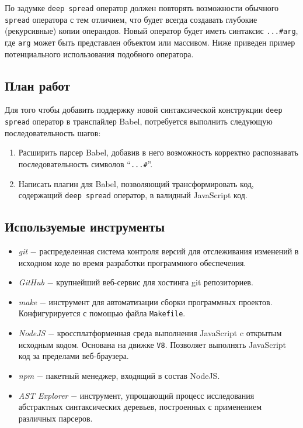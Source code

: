 \documentclass[14pt, a4paper]{article}
\def\code#1{\texttt{#1}} %
\begin{document}
По задумке \code{deep spread} оператор должен повторять возможности обычного \code{spread} оператора с тем отличием,
что будет всегда создавать глубокие (рекурсивные) копии операндов. Новый оператор будет иметь синтаксис \code{...\#arg},
где \code{arg} может быть представлен объектом или массивом. Ниже приведен пример потенциального 
использования подобного оператора.


\subsection{План работ}
Для того чтобы добавить поддержку новой синтаксической конструкции \code{deep spread} оператор в 
транспайлер Babel, потребуется выполнить следующую последовательность шагов:
\begin{enumerate}
  \item Расширить парсер Babel, добавив в него возможность корректно распознавать последовательность символов 
    ``\code{...\#}''. 
  \item Написать плагин для Babel, позволяющий трансформировать код, содержащий \code{deep spread} оператор,
  в валидный JavaScript код.
  
\end{enumerate}

\subsection{Используемые инструменты}
\begin{itemize}
  \item \textit{git} $-$ распределенная система контроля версий для отслеживания изменений в исходном коде 
    во время разработки программного обеспечения.
  \item \textit{GitHub} $-$ крупнейший веб-сервис для хостинга git репозиториев.
  \item \textit{make} $-$ инструмент для автоматизации сборки программных проектов. Конфигурируется с помощью файла 
    \code{Makefile}.
  \item \textit{NodeJS} $-$ кроссплатформенная среда выполнения JavaScript c открытым исходным кодом.
    Основана на движке \code{V8}. Позволяет выполнять JavaScript код за пределами веб-браузера.
  \item \textit{npm} $-$ пакетный менеджер, входящий в состав NodeJS.
  \item \textit{AST Explorer} $-$ инструмент, упрощающий процесс исследования абстрактных 
    синтаксических деревьев, построенных с применением различных парсеров.
\end{itemize}
\end{document}
